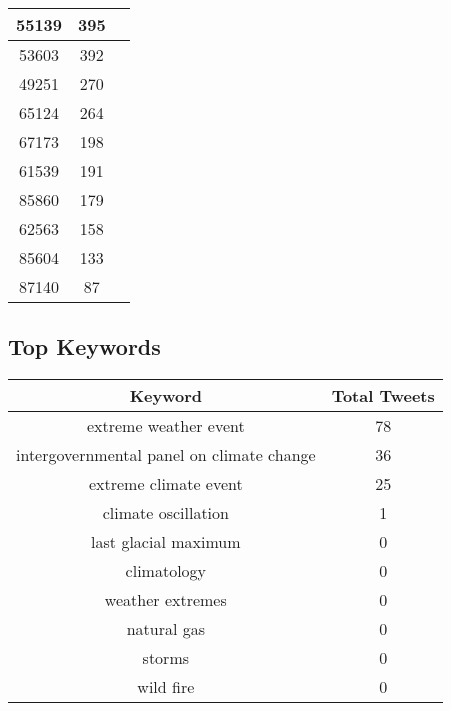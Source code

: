\documentclass{article}\usepackage[T1]{fontenc}
\begin{document}
\begin{tabular}{|c|c|c|}
 \hline
55139 & 395\\ 
 \hline
53603 & 392\\ 
 \hline
49251 & 270\\ 
 \hline
65124 & 264\\ 
 \hline
67173 & 198\\ 
 \hline
61539 & 191\\ 
 \hline
85860 & 179\\ 
 \hline
62563 & 158\\ 
 \hline
85604 & 133\\ 
 \hline
87140 & 87\\ 
 \hline
\end{tabular}\subsection*{Top Keywords}\begin{tabular}{|c|c|}         \hline         Keyword & Total Tweets \\ 
 \hline
extreme weather event & 78\\ 
 \hline
intergovernmental panel on climate change & 36\\ 
 \hline
extreme climate event & 25\\ 
 \hline
climate oscillation & 1\\ 
 \hline
last glacial maximum & 0\\ 
 \hline
climatology & 0\\ 
 \hline
weather extremes & 0\\ 
 \hline
natural gas & 0\\ 
 \hline
storms & 0\\ 
 \hline
wild fire & 0\\ 
 \hline
\end{tabular}
\end{document}
